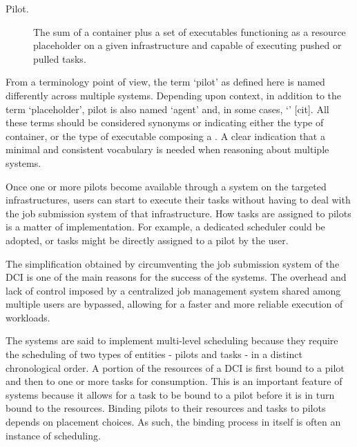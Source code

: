 \documentclass{sig-alternate}
\begin{document}
\begin{description}

\item[Pilot.] The sum of a container plus a set of executables
functioning as a resource placeholder on a given infrastructure and
capable of executing pushed or pulled tasks.


\end{description}

From a terminology point of view, the term `pilot' as defined here is
named differently across multiple \pilotjob systems. Depending upon
context, in addition to the term `placeholder', pilot is also named
`agent' and, in some cases, `\pilotjob' [cit]. All these terms should be
considered synonyms or indicating either the type of container, or the
type of executable composing a \pilot. A clear indication that a minimal
and consistent vocabulary is needed when reasoning about multiple
\pilotjob systems.

Once one or more pilots become available through a \pilotjob system on the
targeted infrastructures, users can start to execute their tasks without
having to deal with the job submission system of that infrastructure.
How tasks are assigned to pilots is a matter of implementation. For example, a
dedicated scheduler could be adopted, or tasks might be directly assigned to a
pilot by the user.

The simplification obtained by circumventing the job submission system of the
DCI is one of the main reasons for the success of the \pilotjob systems. The
overhead and lack of control imposed by a centralized job management system
shared among multiple users are bypassed, allowing for a faster and more
reliable execution of workloads.

The \pilotjob systems are said to implement multi-level scheduling
because they require the scheduling of two types of entities - pilots
and tasks - in a distinct chronological order. A portion of the
resources of a DCI is first bound to a pilot and then to one or more
tasks for consumption.
This is an important feature of \pilotjob systems
because it allows for a task to be bound to a pilot before it is in turn
bound to the resources. Binding pilots to their resources and tasks to
pilots depends on placement choices. As such, the binding process in
itself is often an instance of scheduling.
\end{document}
